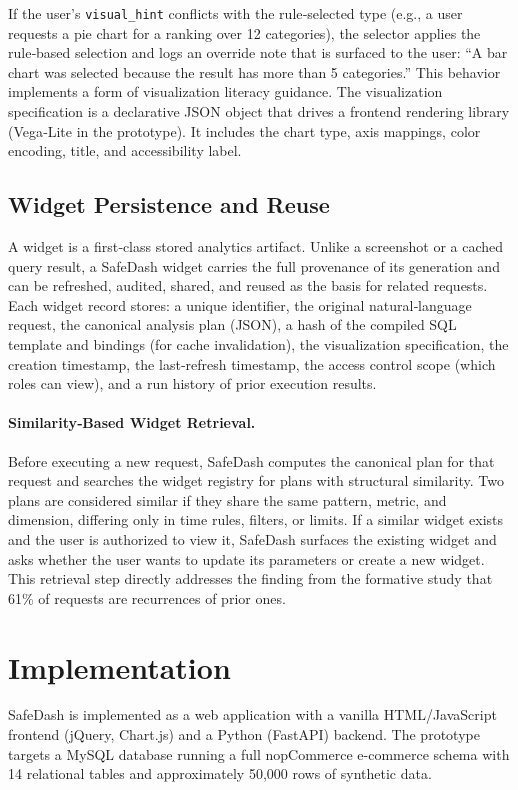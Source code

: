 \documentclass[11pt]{article}
\begin{document}
If the user's \texttt{visual\_hint} conflicts with the rule‑selected type (e.g., a user requests a pie chart for a ranking over 12 categories), the selector applies the rule‑based selection and logs an override note that is surfaced to the user: ``A bar chart was selected because the result has more than 5 categories.'' This behavior implements a form of visualization literacy guidance. The visualization specification is a declarative JSON object that drives a frontend rendering library (Vega‑Lite in the prototype). It includes the chart type, axis mappings, color encoding, title, and accessibility label.

\subsection{Widget Persistence and Reuse\label{sec:widget}}
A widget is a first‑class stored analytics artifact. Unlike a screenshot or a cached query result, a SafeDash widget carries the full provenance of its generation and can be refreshed, audited, shared, and reused as the basis for related requests. Each widget record stores: a unique identifier, the original natural‑language request, the canonical analysis plan (JSON), a hash of the compiled SQL template and bindings (for cache invalidation), the visualization specification, the creation timestamp, the last‑refresh timestamp, the access control scope (which roles can view), and a run history of prior execution results.

\paragraph{Similarity‑Based Widget Retrieval.} Before executing a new request, SafeDash computes the canonical plan for that request and searches the widget registry for plans with structural similarity. Two plans are considered similar if they share the same pattern, metric, and dimension, differing only in time rules, filters, or limits. If a similar widget exists and the user is authorized to view it, SafeDash surfaces the existing widget and asks whether the user wants to update its parameters or create a new widget. This retrieval step directly addresses the finding from the formative study that 61\% of requests are recurrences of prior ones.

\section{Implementation}
SafeDash is implemented as a web application with a vanilla HTML/JavaScript frontend (jQuery, Chart.js) and a Python (FastAPI) backend. The prototype targets a MySQL database running a full nopCommerce e-commerce schema with 14 relational tables and approximately 50,000 rows of synthetic data.
\end{document}
